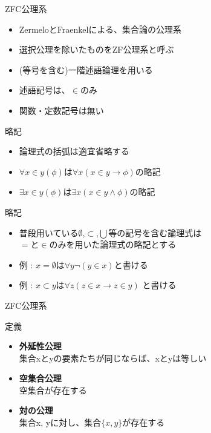 \documentclass[17pt,aspectratio=169]{beamer}
\begin{document}

\begin{frame}{ZFC公理系}
    \begin{itemize}
        \item ZermeloとFraenkelによる、集合論の公理系 %
        \item 選択公理を除いたものをZF公理系と呼ぶ
        \item {\small (等号を含む)}一階述語論理を用いる
        \item 述語記号は、$\in$のみ %
        \item 関数・定数記号は無い %
    \end{itemize}
\end{frame}

\begin{frame}{略記}
    \begin{itemize}
        \item 論理式の括弧は適宜省略する
        \item $\forall x \in y (\phi)$は$\forall x (x \in y \rightarrow \phi)$の略記
        \item $\exists x \in y (\phi)$は$\exists x (x \in y \land \phi)$の略記
    \end{itemize}
\end{frame}

\begin{frame}{略記}
    \begin{itemize}
        \item 普段用いている$\emptyset$,$\subset$,$\bigcup$等の記号を含む論理式は\\
              $=$と$\in$のみを用いた論理式の略記とする
        \item 例 : $x = \emptyset$は$\forall y \neg (y \in x)$と書ける
        \item 例 : $x \subset y$は$\forall z (z \in x \rightarrow z \in y)$ と書ける
    \end{itemize}
\end{frame}

\begin{frame}{ZFC公理系}
    \begin{block}{定義}
        \begin{itemize}
            \item \textbf{外延性公理} \\
                  集合xとyの要素たちが同じならば、xとyは等しい
            \item \textbf{空集合公理} \\
                  空集合が存在する
            \item \textbf{対の公理} \\
                  集合x, yに対し、集合$\{x, y\}$が存在する
        \end{itemize}
    \end{block}
\end{frame}
\end{document}
